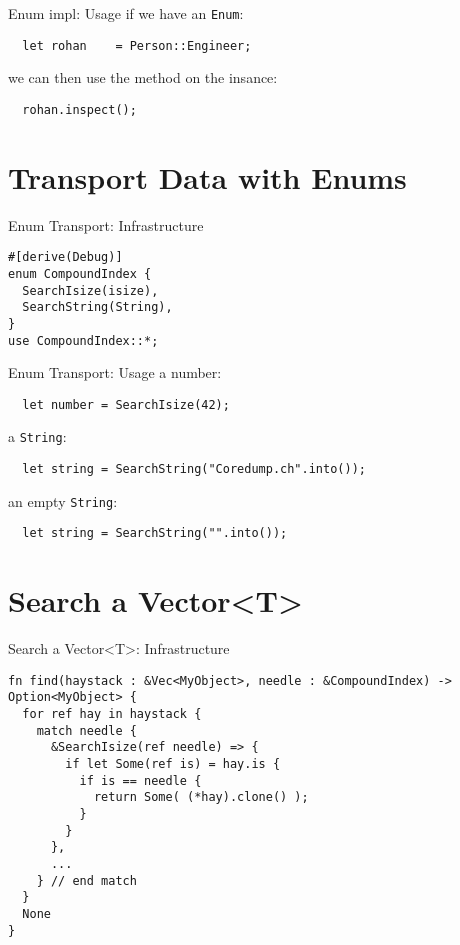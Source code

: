 \documentclass[aspectratio=1610,t]{beamer}
\begin{document}
\begin{frame}[fragile]{Enum impl: Usage}
if we have an \texttt{Enum}:
  \begin{verbatim}
  let rohan    = Person::Engineer;
  \end{verbatim}

\pause
we can then use the method on the insance:
  \begin{verbatim}
  rohan.inspect();
  \end{verbatim}
\end{frame}




{
\section{Transport Data with Enums}
}

\begin{frame}[fragile]{Enum Transport: Infrastructure}
\begin{verbatim}
#[derive(Debug)]
enum CompoundIndex {
  SearchIsize(isize),
  SearchString(String),
}
use CompoundIndex::*;
\end{verbatim}
\end{frame}


\begin{frame}[fragile]{Enum Transport: Usage}
a number:
  \begin{verbatim}
  let number = SearchIsize(42);
  \end{verbatim}

\pause
a \texttt{String}:
  \begin{verbatim}
  let string = SearchString("Coredump.ch".into());
  \end{verbatim}

\pause
an empty \texttt{String}:
  \begin{verbatim}
  let string = SearchString("".into());
  \end{verbatim}
\end{frame}


{
\section{Search a Vector<T>}
}

\begin{frame}[fragile]{Search a Vector<T>: Infrastructure}
\begin{verbatim}
fn find(haystack : &Vec<MyObject>, needle : &CompoundIndex) -> Option<MyObject> {
  for ref hay in haystack {
    match needle {
      &SearchIsize(ref needle) => {
        if let Some(ref is) = hay.is {
          if is == needle {
            return Some( (*hay).clone() );
          }
        }
      },
      ...
    } // end match
  }
  None
}
\end{verbatim}
\end{frame}
\end{document}
